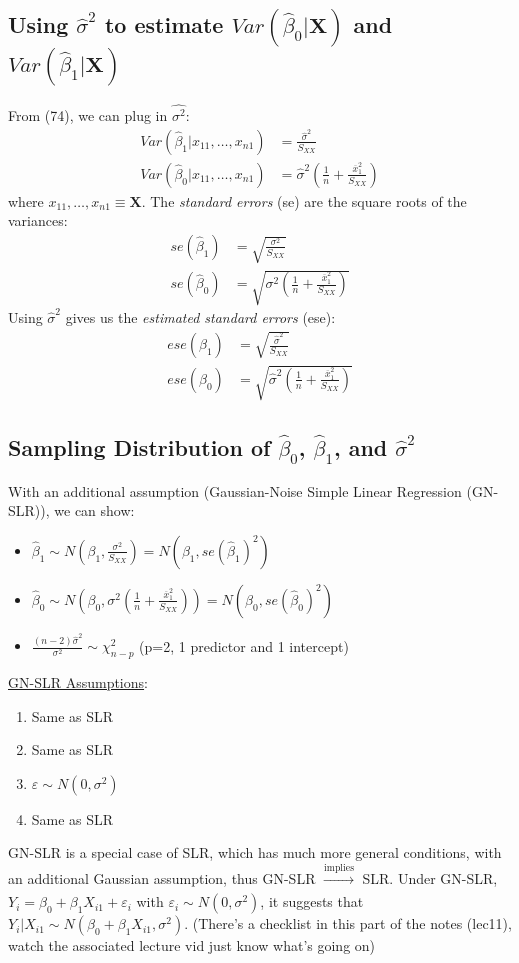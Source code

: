 \documentclass{article}
\newcommand{\boldX}{\mathbf{X}}
\newcommand{\xbar}{\overline{x}}
\newcommand{\betahat}{\hat{\beta}}
\begin{document}
\subsection{Using $\hat{\sigma}^2$ to estimate $Var(\betahat_0|\boldX)$ and $Var(\betahat_1|\boldX)$}
From (74), we can plug in $\hat{\sigma^2}$:
\begin{align}
        Var(\hat{\beta}_1 | x_{11}, \ldots, x_{n1}) &= \frac{\hat{\sigma}^2}{S_{XX}}\\ Var(\hat{\beta}_0 | x_{11}, \ldots, x_{n1}) &= \hat{\sigma}^2\left(\frac{1}{n} + \frac{\xbar_1^2}{S_{XX}}\right)
\end{align}
where $x_{11}, \ldots, x_{n1} \equiv \boldX$. The \textit{standard errors} (se) are the square roots of the variances:
\begin{align}
    se(\hat{\beta}_1) &= \sqrt{\frac{\sigma^2}{S_{XX}}}\\ 
    se(\hat{\beta}_0) &= \sqrt{\sigma^2\left(\frac{1}{n} + \frac{\xbar_1^2}{S_{XX}}\right)}    
\end{align}
Using $\hat{\sigma}^2$ gives us the \textit{estimated standard errors} (ese):
\begin{align}
    ese(\hat{\beta}_1) &= \sqrt{\frac{\hat{\sigma}^2}{S_{XX}}}\\ ese(\hat{\beta}_0) &= \sqrt{\hat{\sigma}^2\left(\frac{1}{n} + \frac{\xbar_1^2}{S_{XX}}\right)}
\end{align}
\subsection{Sampling Distribution of $\betahat_0$, $\betahat_1$, and $\hat{\sigma}^2$}
With an additional assumption (Gaussian-Noise Simple Linear Regression (GN-SLR)), we can show:
\begin{itemize}
    \item $\betahat_1 \sim N\left(\beta_1, \frac{\sigma^2}{S_{XX}}\right) = N(\beta_1, se(\betahat_1)^2)$
    \item $\betahat_0 \sim N\left(\beta_0, \sigma^2\left(\frac{1}{n}+\frac{\xbar_1^2}{S_{XX}}\right)\right) = N(\beta_0, se(\betahat_0)^2)$
    \item $\frac{(n-2)\hat{\sigma}^2}{\sigma^2} \sim \chi^2_{n-p}$ (p=2, 1 predictor and 1 intercept)
\end{itemize}
\underline{GN-SLR Assumptions}:
\begin{enumerate}
    \item Same as SLR
    \item Same as SLR
    \item $\varepsilon \sim N(0, \sigma^2)$
    \item Same as SLR
\end{enumerate}
GN-SLR is a special case of SLR, which has much more general conditions, with an additional Gaussian assumption, thus GN-SLR $\xrightarrow[]{\text{implies}}$ SLR. Under GN-SLR, $Y_i = \beta_0 + \beta_1X_{i1} + \varepsilon_i$ with $\varepsilon_i \sim N(0,\sigma^2)$, it suggests that $Y_i | X_{i1} \sim N(\beta_0+\beta_1X_{i1}, \sigma^2)$. (There's a checklist in this part of the notes (lec11), watch the associated lecture vid just know what's going on)
\end{document}
